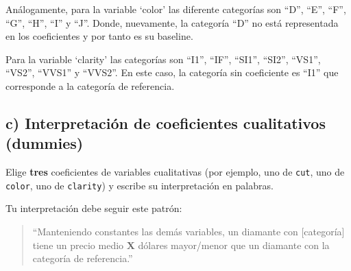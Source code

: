 \documentclass[
  spanish,
]{article}
\begin{document}
Análogamente, para la variable `color' las diferente categorías son
``D'', ``E'', ``F'', ``G'', ``H'', ``I'' y ``J''. Donde, nuevamente, la
categoría ``D'' no está representada en los coeficientes y por tanto es
su baseline.

Para la variable `clarity' las categorías son ``I1'', ``IF'', ``SI1'',
``SI2'', ``VS1'', ``VS2'', ``VVS1'' y ``VVS2''. En este caso, la
categoría sin coeficiente es ``I1'' que corresponde a la categoría de
referencia.

\subsection*{c) Interpretación de coeficientes cualitativos
(dummies)}\label{c-interpretaciuxf3n-de-coeficientes-cualitativos-dummies}

Elige \textbf{tres} coeficientes de variables cualitativas (por ejemplo,
uno de \texttt{cut}, uno de \texttt{color}, uno de \texttt{clarity}) y
escribe su interpretación en palabras.

Tu interpretación debe seguir este patrón:

\begin{quote}
``Manteniendo constantes las demás variables, un diamante con
{[}categoría{]} tiene un precio medio \textbf{X} dólares mayor/menor que
un diamante con la categoría de referencia.''
\end{quote}
\end{document}
